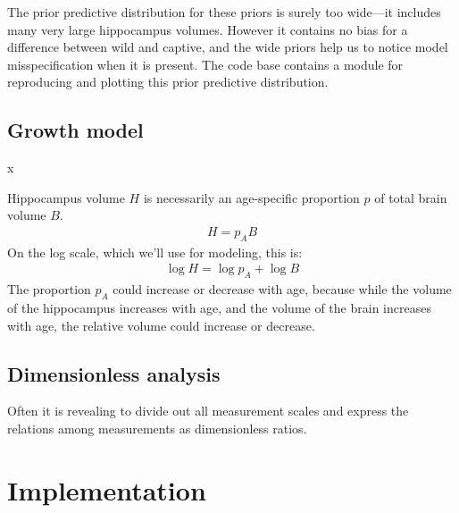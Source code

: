 \documentclass[reqno ,11pt]{amsart}
\begin{document}
The prior predictive distribution for these priors is surely too wide---it includes many very large hippocampus volumes. However it contains no bias for a difference between wild and captive, and the wide priors help us to notice model misspecification when it is present. The code base contains a module for reproducing and plotting this prior predictive distribution.


\subsection{Growth model}
x

Hippocampus volume $H$ is necessarily an age-specific proportion $p$ of total brain volume $B$.
\begin{align}
H = p_A B
\end{align}
On the log scale, which we'll use for modeling, this is:
\begin{align*}
\log H = \log p_A + \log B
\end{align*}
The proportion $p_A$ could increase or decrease with age, because while the volume of the hippocampus increases with age, and the volume of the brain increases with age, the relative volume could increase or decrease.


\subsection{Dimensionless analysis}

Often it is revealing to divide out all measurement scales and express the relations among measurements as dimensionless ratios. 


\section{Implementation}
\end{document}
